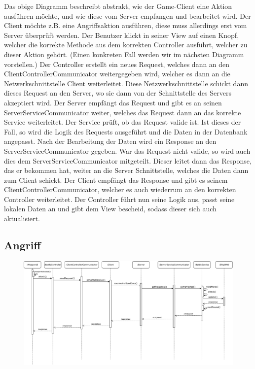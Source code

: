 \documentclass[fontsize=12pt,paper=a4,twoside]{scrartcl}
\begin{document}
Das obige Diagramm beschreibt abstrakt, wie der Game-Client eine Aktion ausführen möchte, und wie diese vom Server empfangen und bearbeitet wird.
Der Client möchte z.B. eine Angriffsaktion ausführen, diese muss allerdings erst vom Server überprüft werden. Der Benutzer klickt in seiner View auf einen Knopf, welcher die 
korrekte Methode aus dem korrekten Controller ausführt, welcher zu dieser Aktion gehört. (Einen konkreten Fall werden wir im nächsten Diagramm vorstellen.)
Der Controller erstellt ein neues Request, welches dann an den ClientControllerCommunicator weitergegeben wird, welcher es dann an die Netwerkschnittstelle Client weiterleitet. Diese Netzwerkschnittstelle schickt dann dieses Request an den Server, wo sie dann von der Schnittstelle des Servers akzeptiert wird. Der Server empfängt das Request und gibt es an seinen ServerServiceCommunicator weiter, welches das Request dann an das korrekte Service weiterleitet. Der Service prüft, ob das Request valide ist. Ist dieses der Fall, so wird die Logik des Requests ausgeführt und die Daten in der Datenbank angepasst. Nach der Bearbeitung der Daten wird ein Response an den ServerServiceCommunicator gegeben. War das Request nicht valide, so wird auch dies dem ServerServiceCommunicator mitgeteilt. Dieser leitet dann das Response, das er bekommen hat, weiter an die Server Schnittstelle, welches die Daten dann zum Client schickt. Der Client empfängt das Response und gibt es seinem ClientControllerCommunicator, welcher es auch wiederrum an den korrekten Controller weiterleitet. Der Controller führt nun seine Logik aus, passt seine lokalen Daten an und gibt dem View bescheid, sodass dieser sich auch aktualisiert.

\subsection{Angriff}

\begin{figure}[H]
\begin{center}
  \includegraphics[width=\linewidth]{UML/Sequenz-Attack.pdf}
\end{center}
\end{figure}
\end{document}
